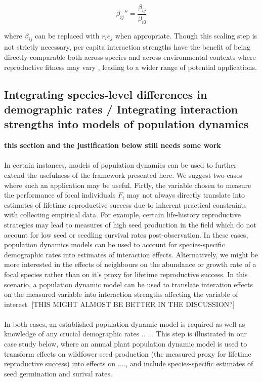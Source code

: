 \documentclass[a4,12pt]{article}
\begin{document}
\begin{itemize}
        \begin{equation}
        {\beta_{ij}}'' = \frac{\beta_{ij}}{\beta_{i0}}
        \label{scaling}
        \end{equation}

        where $\beta_{ij}$ can be replaced with $r_i e_j$ when appropriate. Though this scaling step is not strictly necessary, per capita interaction strengths have the benefit of being directly comparable both across species and across environmental contexts where reproductive fitness may vary \parencite{Wootton2005}, leading to a wider range of potential applications.

    \subsection{Integrating species-level differences in demographic rates / Integrating interaction strengths into models of population dynamics}

    \textbf{this section and the justification below still needs some work}

        \paragraph{}
        In certain instances, models of population dynamics can be used to further extend the usefulness of the framework presented here. We suggest two cases where such an application may be useful. Firtly, the variable chosen to measure the performance of focal individuals $F_i$ may not always directly translate into estimates of lifetime reproductive success due to inherent practical constraints with collecting empirical data. For example, certain life-history reproductive strategies may lead to measures of high seed production in the field which do not account for low seed or seedling survival rates post-observation. In these cases, population dynamics models can be used to account for species-specific demographic rates into estimates of interaction effects. Alternatively, we might be more interested in the effects of neighbours on the abundance or growth rate of a focal species rather than on it's proxy for lifetime reproductive success. In this scenario, a population dynamic model can be used to translate interation effects on the measured variable into interaction strengths affecting the variable of interest. [THIS MIGHT ALMOST BE BETTER IN THE DISCUSSION?]

        \paragraph{}
        In both cases, an established population dynamic model is required as well as knowledge of any crucial demographic rates ..
        ... This step is illustrated in our case study below, where an annual plant population dynamic model is used to transform effects on wildfower seed production (the measured proxy for lifetime reproductive success) into effects on ...., and include species-specific estimates of seed germination and surival rates. 


\end{itemize}
\end{document}
